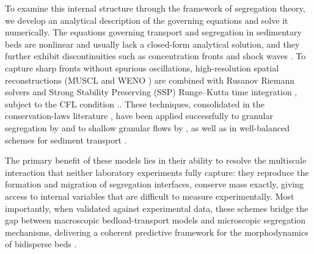 \documentclass[lineno]{JFM-FLM_Au}
\begin{document}
To examine this internal structure through the framework of segregation theory, we develop an analytical description of the governing equations and solve it numerically. The equations governing transport and segregation in sedimentary beds are nonlinear and usually lack a closed-form analytical solution, and they further exhibit discontinuities such as concentration fronts and shock waves \citep{savagehutter1989,gray2005}. To capture sharp fronts without spurious oscillations, high-resolution spatial reconstructions (MUSCL \citep{vanLeer1979} and WENO \citep{Liu1994,JiangShu1996,Henrick2005}) are combined with Rusanov Riemann solvers \citep{rusanov1961} and Strong Stability Preserving (SSP) Runge--Kutta time integration \citep{GottliebShuTadmor2001}, subject to the CFL condition \citep{CourantFriedrichsLewy1928}.. These techniques, consolidated in the conservation-laws literature \citep{toro2009}, have been applied successfully to granular segregation by \citet{Christov2017} and to shallow granular flows by \citet{Tai2015}, as well as in well-balanced schemes for sediment transport \citep{Burger2011,chiavassa2016}.

The primary benefit of these models lies in their ability to resolve the multiscale interaction that neither laboratory experiments fully capture: they reproduce the formation and migration of segregation interfaces, conserve mass exactly, giving access to internal variables that are difficult to measure experimentally. Most importantly, when validated against experimental data, these schemes bridge the gap between macroscopic bedload-transport models and microscopic segregation mechanisms, delivering a coherent predictive framework for the morphodynamics of bidisperse beds \citep{Christov2017,Tai2015}. 
\end{document}

